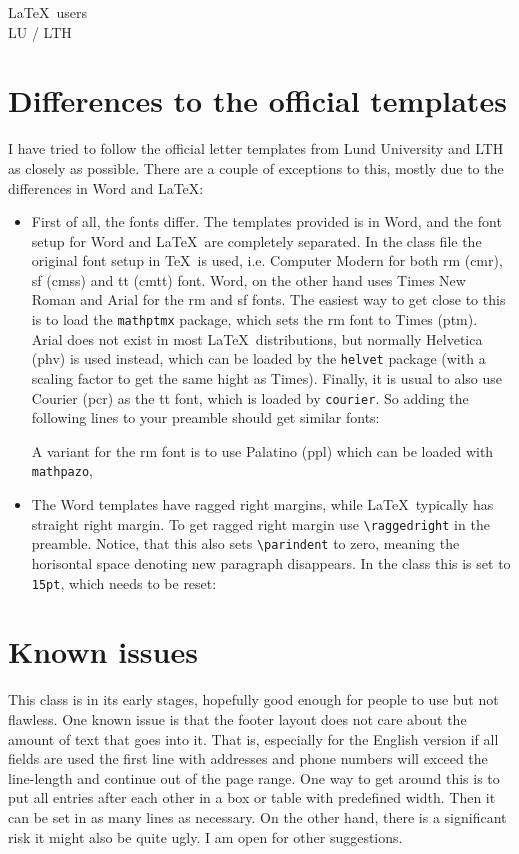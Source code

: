 \documentclass[11pt,eng,LTH,logoBW]{ulundletter}
\begin{document}
\begin{letter}{\LaTeX\ users\\ LU / LTH}
  \section{Differences to the official templates}
  I have tried to follow the official letter templates from Lund University and LTH as closely as possible. There are a couple of exceptions to this, mostly due to the differences in Word and \LaTeX:
  \begin{itemize}
  \item First of all, the fonts differ. The templates provided is in Word, and the font setup for Word and \LaTeX\ are completely separated. In the class file the original font setup in \TeX\ is used, i.e. Computer Modern for both rm (cmr), sf (cmss) and tt (cmtt) font. Word, on the other hand uses Times New Roman and Arial for the rm and sf fonts. The easiest way to get close to this is to load the \texttt{mathptmx} package, which sets the rm font to Times (ptm). Arial does not exist in most \LaTeX\ distributions, but normally Helvetica (phv) is used instead, which can be loaded by the \texttt{helvet} package (with a scaling factor to get the same hight as Times). Finally, it is usual to also use Courier (pcr) as the tt font, which is loaded by \texttt{courier}. So adding the following lines to your preamble should get similar fonts:
    \begin{CodeBox}{}
\usepackage{mathptmx}
\usepackage[scaled=.93]{helvet}
\usepackage{courier}
    \end{CodeBox}
    A variant for the rm font is to use Palatino (ppl) which can be loaded with \texttt{mathpazo}, 
    \begin{CodeBox}{}
\usepackage{mathpazo}
\usepackage[scaled=.93]{helvet}
\usepackage{courier}
    \end{CodeBox}
  \item The Word templates have ragged right margins, while \LaTeX\ typically has straight right margin. To get ragged right margin use \verb|\raggedright| in the preamble. Notice, that this also sets \verb|\parindent| to zero, meaning the horisontal space denoting new paragraph disappears. In the class this is set to \texttt{15pt}, which needs to be reset:
    \begin{CodeBox}{}
\raggedright
\parindent=15pt
    \end{CodeBox}
  \end{itemize}
  \section{Known issues}
  This class is in its early stages, hopefully good enough for people to use but not flawless. One known issue is that the footer layout does not care about the amount of text that goes into it. That is, especially for the English version if all fields are used the first line with addresses and phone numbers will exceed the line-length and continue out of the page range. One way to get around this is to put all entries after each other in a box or table with predefined width. Then it can be set in as many lines as necessary. On the other hand, there is a significant risk it might also be quite ugly. I am open for other suggestions.


\end{letter}
\end{document}
